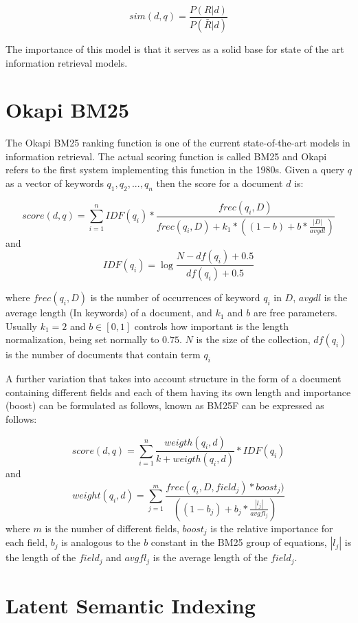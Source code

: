 $$sim(d,q) = \frac{ P(R|d)} {P(\bar{R} |d)} $$

The importance of this model is that it serves as a solid base for state of the art information retrieval models.

\section{Okapi BM25}

The Okapi BM25 ranking function is one of the current state-of-the-art models in information retrieval\cite{okapibm25}. The actual scoring function is called BM25 and Okapi refers to the first system implementing this function in the 1980s. 
Given a query $q$ as a vector of keywords $q_{1}, q_{2}, ... , q_{n}$ then the score for a document $d$ is:

$$score(d, q) = \sum_{i=1}^{n}IDF{(q_i)}*\frac{ frec(q_i, D)}{frec(q_i, D)+k_1*((1-b)+b*\frac{|D|}{avgdl})} $$
and $$IDF(q_i) = \log{\frac{N - df(q_i)+0.5}{df(q_i)+0.5}} $$

where $frec(q_i, D)$ is the number of occurrences of keyword $q_i$ in $D$, $avgdl$ is the average length (In keywords) of a document, and $k_1$ and $b$ are free parameters. Usually $k_1 = 2$ and $b \in [0, 1]$ controls how important is the length normalization, being set normally to $0.75$. $N$ is the size of the collection, $df(q_i)$ is the number of documents that contain term $q_i$ 

A further variation that takes into account structure in the form of a document containing different fields and each of them having its own length and importance (boost) can be formulated as follows, known as BM25F can be expressed as follows:


$$score(d, q) = \sum_{i=1}^{n} \frac{weigth(q_i, d)}{k+ weigth(q_i, d)} * IDF(q_i)$$
and 
$$weight(q_i, d) = \sum_{j=1}^m \frac{frec(q_i, D, field_j)*boost_j)}{((1-b_j) + b_j*\frac{|l_j|}{avgfl_j})} $$
where $m$ is the number of different fields, $boost_j$ is the relative importance for each field, $b_j$ is analogous to the $b$ constant in the BM25 group of equations, $|l_j|$ is the length of the $field_j$ and $avgfl_j$ is the average length of the $field_j$.

\section{Latent Semantic Indexing}

